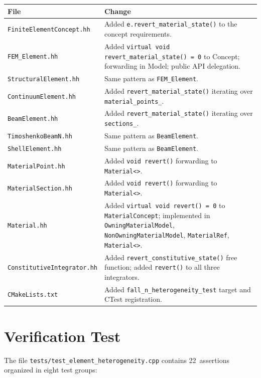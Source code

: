 \begin{center}
\small
\begin{tabular}{lp{8.5cm}}
\toprule
\textbf{File} & \textbf{Change} \\
\midrule
\texttt{FiniteElementConcept.hh} &
  Added \texttt{e.revert\_material\_state()} to the concept
  requirements. \\
\texttt{FEM\_Element.hh} &
  Added \texttt{virtual void revert\_material\_state() = 0} to Concept;
  forwarding in Model; public API delegation. \\
\texttt{StructuralElement.hh} &
  Same pattern as \texttt{FEM\_Element}. \\
\texttt{ContinuumElement.hh} &
  Added \texttt{revert\_material\_state()} iterating over
  \texttt{material\_points\_}. \\
\texttt{BeamElement.hh} &
  Added \texttt{revert\_material\_state()} iterating over
  \texttt{sections\_}. \\
\texttt{TimoshenkoBeamN.hh} &
  Same pattern as \texttt{BeamElement}. \\
\texttt{ShellElement.hh} &
  Same pattern as \texttt{BeamElement}. \\
\texttt{MaterialPoint.hh} &
  Added \texttt{void revert()} forwarding to \texttt{Material<>}. \\
\texttt{MaterialSection.hh} &
  Added \texttt{void revert()} forwarding to \texttt{Material<>}. \\
\texttt{Material.hh} &
  Added \texttt{virtual void revert() = 0} to \texttt{MaterialConcept};
  implemented in \texttt{OwningMaterialModel},
  \texttt{NonOwningMaterialModel}, \texttt{MaterialRef},
  \texttt{Material<>}. \\
\texttt{ConstitutiveIntegrator.hh} &
  Added \texttt{revert\_constitutive\_state()} free function;
  added \texttt{revert()} to all three integrators. \\
\texttt{CMakeLists.txt} &
  Added \texttt{fall\_n\_heterogeneity\_test} target and CTest
  registration. \\
\bottomrule
\end{tabular}
\end{center}

\section{Verification Test}
\label{sec:verification-test}

The file \texttt{tests/test\_element\_heterogeneity.cpp} contains
22~assertions organized in eight test groups:

